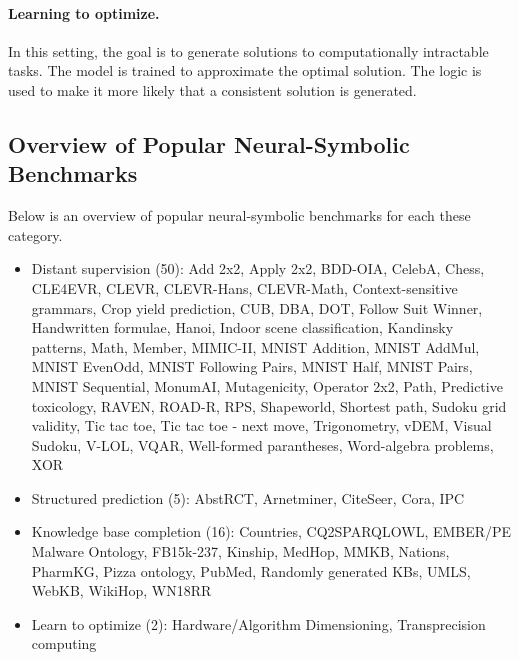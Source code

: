 \paragraph{Learning to optimize.}
In this setting, the goal is to generate solutions to computationally intractable tasks. The model is trained to approximate the optimal solution. The logic is used to make it more likely that a consistent solution is generated.


\subsection*{Overview of Popular Neural-Symbolic Benchmarks}

Below is an overview of popular neural-symbolic benchmarks for each these category.

\begin{itemize}
    \item Distant supervision (50): Add 2x2, Apply 2x2, BDD-OIA, CelebA, Chess, CLE4EVR, CLEVR, CLEVR-Hans, CLEVR-Math, Context-sensitive grammars, Crop yield prediction, CUB, DBA, DOT, Follow Suit Winner, Handwritten formulae, Hanoi, Indoor scene classification, Kandinsky patterns, Math, Member, MIMIC-II, MNIST Addition, MNIST AddMul, MNIST EvenOdd, MNIST Following Pairs, MNIST Half, MNIST Pairs, MNIST Sequential, MonumAI, Mutagenicity, Operator 2x2, Path, Predictive toxicology, RAVEN, ROAD-R, RPS, Shapeworld, Shortest path, Sudoku grid validity, Tic tac toe, Tic tac toe - next move, Trigonometry, vDEM, Visual Sudoku, V-LOL, VQAR, Well-formed parantheses, Word-algebra problems, XOR
    \item Structured prediction (5): AbstRCT, Arnetminer, CiteSeer, Cora, IPC
    \item Knowledge base completion (16): Countries, CQ2SPARQLOWL, EMBER/PE Malware Ontology, FB15k-237, Kinship, MedHop, MMKB, Nations, PharmKG, Pizza ontology, PubMed, Randomly generated KBs, UMLS, WebKB, WikiHop, WN18RR
    \item Learn to optimize (2): Hardware/Algorithm Dimensioning, Transprecision computing
\end{itemize}


